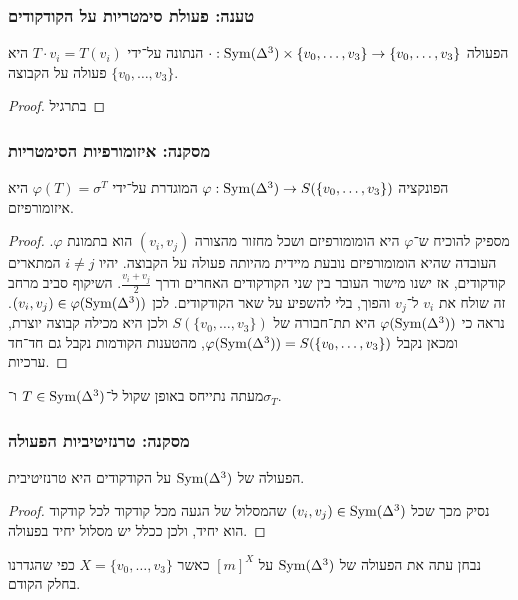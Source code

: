 \subsubsection{טענה: פעולת סימטריות על הקודקודים}
הפעולה $\cdot : \operatorname{Sym}(\Delta^3) \times \{v_0, \dots, v_3\} \to \{v_0, \dots, v_3\}$ הנתונה על־ידי $T \cdot v_i = T(v_i)$ היא פעולה על הקבוצה $\{v_0, \dots, v_3\}$.
\begin{proof}
	בתרגיל
\end{proof}

\subsubsection{מסקנה: איזומורפיות הסימטריות}
הפונקציה $\varphi : \operatorname{Sym}(\Delta^3) \to S(\{v_0, \dots, v_3\})$ המוגדרת על־ידי $\varphi(T) = \sigma^T$ היא איזומורפיזם.
\begin{proof}
	מספיק להוכיח ש־$\varphi$ היא הומומורפיזם ושכל מחזור מהצורה $(v_i, v_j)$ הוא בתמונת $\varphi$.
	העובדה שהיא הומומורפיזם נובעת מיידית מהיותה פעולה על הקבוצה.
	יהיו $i \ne j$ המתארים קודקודים, אז ישנו מישור העובר בין שני הקודקודים האחרים ודרך $\frac{v_i + v_j}{2}$.
	השיקוף סביב מרחב זה שולח את $v_i$ ל־$v_j$ והפוך, בלי להשפיע על שאר הקודקודים.
	לכן $(v_i, v_j) \in \varphi(\operatorname{Sym}(\Delta^3))$. נראה כי $\varphi(\operatorname{Sym}(\Delta^3))$ היא תת־חבורה של $S(\{v_0, \dots, v_3\})$ ולכן היא מכילה קבוצה יוצרת, ומכאן נקבל
	$\varphi(\operatorname{Sym}(\Delta^3)) = S(\{v_0, \dots, v_3\})$, מהטענות הקודמות נקבל גם חד־חד ערכיות.
\end{proof}

מעתה נתייחס באופן שקול ל־$T \in \operatorname{Sym}(\Delta^3)$ ו־$\sigma_T$.

\subsubsection{מסקנה: טרנזיטיביות הפעולה}
הפעולה של $\operatorname{Sym}(\Delta^3)$ על הקודקודים היא טרנזיטיבית.
\begin{proof}
	נסיק מכך שכל $(v_i, v_j) \in \operatorname{Sym}(\Delta^3)$ שהמסלול של הגעה מכל קודקוד לכל קודקוד הוא יחיד, ולכן ככלל יש מסלול יחיד בפעולה.
\end{proof}

נבחן עתה את הפעולה של $\operatorname{Sym}(\Delta^3)$ על ${[m]}^X$ כאשר $X = \{v_0, \dots, v_3\}$ כפי שהגדרנו בחלק הקודם.

